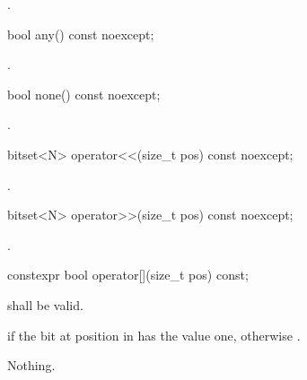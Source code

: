 \begin{itemdescr}
\pnum
\returns {}.
\end{itemdescr}

%
%
\begin{itemdecl}
bool any() const noexcept;
\end{itemdecl}

\begin{itemdescr}
\pnum
\returns {}.
\end{itemdescr}

%
\begin{itemdecl}
bool none() const noexcept;
\end{itemdecl}

\begin{itemdescr}
\pnum
\returns {}.
\end{itemdescr}

%
\begin{itemdecl}
bitset<N> operator<<(size_t pos) const noexcept;
\end{itemdecl}

\begin{itemdescr}
\pnum
\returns
{}.
\end{itemdescr}

%
\begin{itemdecl}
bitset<N> operator>>(size_t pos) const noexcept;
\end{itemdecl}

\begin{itemdescr}
\pnum
\returns
{}.
\end{itemdescr}

%
\begin{itemdecl}
constexpr bool operator[](size_t pos) const;
\end{itemdecl}

\begin{itemdescr}
\pnum
\requires
{} shall be valid.

\pnum
\returns
{} if the bit at position  in  has the value
one, otherwise .

\pnum
\throws Nothing.
\end{itemdescr}

